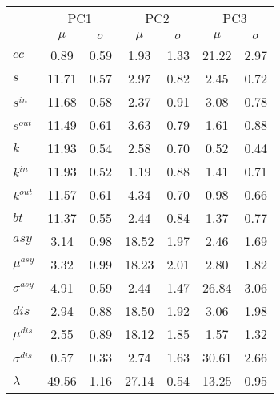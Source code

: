 \begin{center}
\begin{tabular}{| l | c | c | c | c | c | c |}\cline{2-7}
\multicolumn{1}{c|}{} & \multicolumn{2}{c|}{PC1}          & \multicolumn{2}{c|}{PC2} & \multicolumn{2}{c|}{PC3}  \\\cline{2-7}\multicolumn{1}{c|}{} & $\mu$            & $\sigma$ & $\mu$         & $\sigma$ & $\mu$ & $\sigma$  \\\hline
$cc$ & 0.89  & 0.59  & 1.93  & 1.33  & 21.22  & 2.97 \\\hline
$s$ & 11.71  & 0.57  & 2.97  & 0.82  & 2.45  & 0.72 \\
$s^{in}$ & 11.68  & 0.58  & 2.37  & 0.91  & 3.08  & 0.78 \\
$s^{out}$ & 11.49  & 0.61  & 3.63  & 0.79  & 1.61  & 0.88 \\
$k$ & 11.93  & 0.54  & 2.58  & 0.70  & 0.52  & 0.44 \\
$k^{in}$ & 11.93  & 0.52  & 1.19  & 0.88  & 1.41  & 0.71 \\
$k^{out}$ & 11.57  & 0.61  & 4.34  & 0.70  & 0.98  & 0.66 \\
$bt$ & 11.37  & 0.55  & 2.44  & 0.84  & 1.37  & 0.77 \\\hline
$asy$ & 3.14  & 0.98  & 18.52  & 1.97  & 2.46  & 1.69 \\
$\mu^{asy}$ & 3.32  & 0.99  & 18.23  & 2.01  & 2.80  & 1.82 \\
$\sigma^{asy}$ & 4.91  & 0.59  & 2.44  & 1.47  & 26.84  & 3.06 \\
$dis$ & 2.94  & 0.88  & 18.50  & 1.92  & 3.06  & 1.98 \\
$\mu^{dis}$ & 2.55  & 0.89  & 18.12  & 1.85  & 1.57  & 1.32 \\
$\sigma^{dis}$ & 0.57  & 0.33  & 2.74  & 1.63  & 30.61  & 2.66 \\\hline\hline
$\lambda$ & 49.56  & 1.16  & 27.14  & 0.54  & 13.25  & 0.95 \\
\hline\end{tabular}
\end{center}
